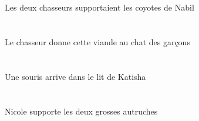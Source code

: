 \begin{exe}
   \DEFDuErgP{}   \chasseurCDuErgP{}   \DEFPlAbsP{}    \INDSgOblP{}   \NabilDSgOblP{}   \DEP{}   \coyoteCPlAbsP{}  \supporterVtPstCPlP{} \\
   \DEFDuErgG{}   \chasseurCDuErgG{}   \DEFPlAbsG{}    \INDSgOblG{}   \NabilDSgOblG{}   \DEG{}   \coyoteCPlAbsG{}  \supporterVtPstCPlG{} \\
 Les deux chasseurs supportaient les coyotes de Nabil
\ex\glll
   \DEFSgErg{}   \chasseurCSgErg{}    \DEFSgObl{}    \DEFPlObl{}   \garconDPlObl{}   \DE{}   \chatDSgObl{}   \A{}   \DEMSgAbs{}   \viandeASgAbs{}  \donnerVdPrsASg{} \\
   \DEFSgErgP{}   \chasseurCSgErgP{}    \DEFSgOblP{}    \DEFPlOblP{}   \garconDPlOblP{}   \DEP{}   \chatDSgOblP{}   \AP{}   \DEMSgAbsP{}   \viandeASgAbsP{}  \donnerVdPrsASgP{} \\
   \DEFSgErgG{}   \chasseurCSgErgG{}    \DEFSgOblG{}    \DEFPlOblG{}   \garconDPlOblG{}   \DEG{}   \chatDSgOblG{}   \AG{}   \DEMSgAbsG{}   \viandeASgAbsG{}  \donnerVdPrsASgG{} \\
 Le chasseur donne cette viande au chat des garçons
\ex\glll
   \INDSgAbs{}   \sourisBSgAbs{}    \DEFSgObl{}    \INDSgObl{}   \KatishaASgObl{}   \DE{}   \litDSgObl{}   \DANS{}  \arriverViPrsBSg{} \\
   \INDSgAbsP{}   \sourisBSgAbsP{}    \DEFSgOblP{}    \INDSgOblP{}   \KatishaASgOblP{}   \DEP{}   \litDSgOblP{}   \DANSP{}  \arriverViPrsBSgP{} \\
   \INDSgAbsG{}   \sourisBSgAbsG{}    \DEFSgOblG{}    \INDSgOblG{}   \KatishaASgOblG{}   \DEG{}   \litDSgOblG{}   \DANSG{}  \arriverViPrsBSgG{} \\
 Une souris arrive dans le lit de Katisha
\ex\glll
   \INDSgErg{}   \NicoleBSgErg{}   \DEFDuAbs{}   \grosBDu{}   \autrucheBDuAbs{}  \supporterVtPrsBDu{} \\
   \INDSgErgP{}   \NicoleBSgErgP{}   \DEFDuAbsP{}   \grosBDuP{}   \autrucheBDuAbsP{}  \supporterVtPrsBDuP{} \\
   \INDSgErgG{}   \NicoleBSgErgG{}   \DEFDuAbsG{}   \grosBDuG{}   \autrucheBDuAbsG{}  \supporterVtPrsBDuG{} \\
 Nicole supporte les deux grosses autruches
\ex\glll
    \DEFSgObl{}   \cuisineDSgObl{}   \DANS{}   \INDDuErg{}   \maigreCDu{}   \chasseurCDuErg{}    \INDSgDat{}   \KatishaASgDat{}   \INDPlAbs{}   \jauneCPl{}   \oeufCPlAbs{}  \lancerVdPstCPl{} \\
    \DEFSgOblP{}   \cuisineDSgOblP{}   \DANSP{}   \INDDuErgP{}   \maigreCDuP{}   \chasseurCDuErgP{}    \INDSgDatP{}   \KatishaASgDatP{}   \INDPlAbsP{}   \jauneCPlP{}   \oeufCPlAbsP{}  \lancerVdPstCPlP{} \\

\end{exe}
